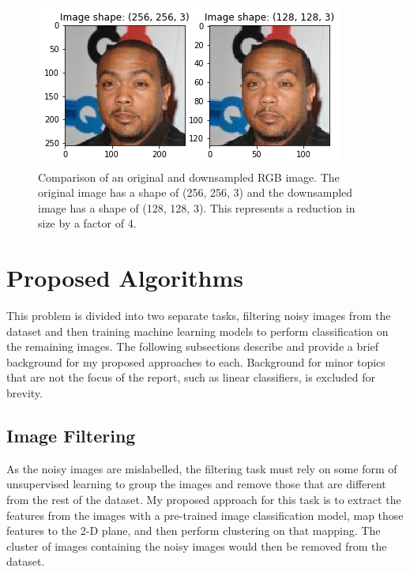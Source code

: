 \documentclass[10pt,twocolumn,letterpaper]{article}
\begin{document}
\begin{figure}[!htbp]
\begin{center}
\includegraphics[width=1\linewidth]{downsample_comparison.png}
\end{center}
   \caption{Comparison of an original and downsampled RGB image. The original image has a shape of (256, 256, 3)
   and the downsampled image has a shape of (128, 128, 3). This represents a reduction in size by a factor of 4.}
\label{fig:downsample}
\end{figure}


\section{Proposed Algorithms} \label{algorithms}
This problem is divided into two separate tasks, filtering noisy images from the dataset and then training machine learning models to perform classification on the remaining images. The following subsections describe and provide a brief background for my proposed approaches to each. Background for minor topics that are not the focus of the report, such as linear classifiers, is excluded for brevity. 

\subsection{Image Filtering} \label{filtering}
 As the noisy images are mislabelled, the filtering task must rely on some form of unsupervised learning to group the images and remove those that are different from the rest of the dataset. My proposed approach for this task is to extract the features from the images with a pre-trained image classification model, map those features to the 2-D plane, and then perform clustering on that mapping. The cluster of images containing the noisy images would then be removed from the dataset.
\end{document}
